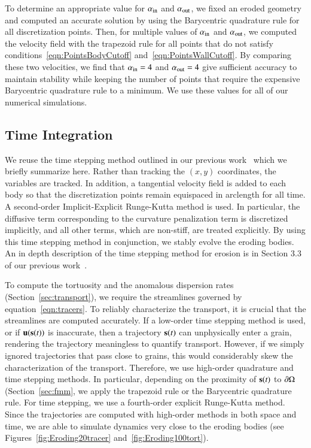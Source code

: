 \documentclass[preprint, 10pt]{elsarticle}
\begin{document}
To determine an appropriate value for $\alpha_\iin$ and $\alpha_\out$,
we fixed an eroded geometry and computed an accurate solution by using
the Barycentric quadrature rule for all discretization points.  Then,
for multiple values of $\alpha_\iin$ and $\alpha_\out$, we computed the
velocity field with the trapezoid rule for all points that do not
satisfy conditions~\eqref{eqn:PointsBodyCutoff}
and~\eqref{eqn:PointsWallCutoff}.  By comparing these two velocities, we
find that $\alpha_\iin = 4$ and $\alpha_\out = 4$ give sufficient
accuracy to maintain stability while keeping the number of points that
require the expensive Barycentric quadrature rule to a minimum.  We use
these values for all of our numerical simulations.

\subsection{Time Integration}
\label{sec:time}
We reuse the time stepping method outlined in our previous
work~\cite{qua-moo2018} which we briefly summarize here.  Rather than
tracking the $(x,y)$ coordinates, the {\thL} variables are tracked. In
addition, a tangential velocity field is added to each body so that the
discretization points remain equispaced in arclength for all time.  A
second-order Implicit-Explicit Runge-Kutta method is used. In
particular, the diffusive term corresponding to the curvature
penalization term is discretized implicitly, and all other terms, which
are non-stiff, are treated explicitly.  By using this time stepping
method in conjunction, we stably evolve the eroding bodies.   An in
depth description of the time stepping method for erosion is in Section
3.3 of our previous work~\cite{qua-moo2018}.

To compute the tortuosity and the anomalous dispersion rates
(Section~\ref{sec:transport}), we require the streamlines governed by equation~\eqref{eqn:tracers}.  To reliably
characterize the transport, it is crucial that the streamlines are
computed accurately.  If a low-order time stepping method is used, or if
$\uu(\ss(t))$ is inaccurate, then a trajectory $\ss(t)$ can unphysically
enter a grain, rendering the trajectory meaningless to quantify
transport.  However, if we simply ignored trajectories that pass close
to grains, this would considerably skew the characterization of the
transport. Therefore, we use high-order quadrature and time stepping
methods.  In particular, depending on the proximity of $\ss(t)$ to
$\bd\Omega$ (Section~\ref{sec:fmm}, we apply the trapezoid rule or the
Barycentric quadrature rule.  For time stepping, we use a fourth-order
explicit Runge-Kutta method.  Since the trajectories are computed with
high-order methods in both space and time,  we are able to simulate
dynamics very close to the eroding bodies (see
Figures~\ref{fig:Eroding20tracer} and~\ref{fig:Eroding100tort}).
\end{document}
